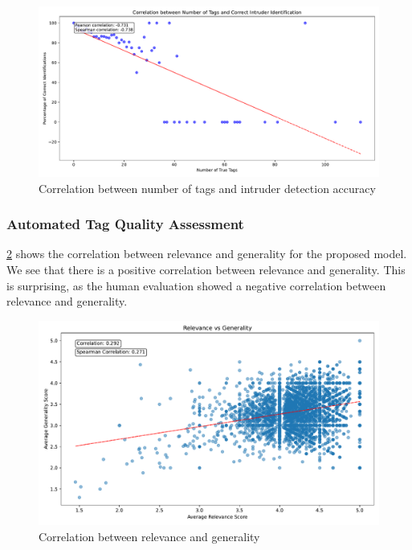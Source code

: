 \begin{figure}[h]
    \centering
    \includegraphics[width=\textwidth]{figures/gpt_correlation_num_tags.pdf}
    \caption{Correlation between number of tags and intruder detection accuracy}
    \label{fig:gpt_correlation_num_tags}
\end{figure}

\subsubsection{Automated Tag Quality Assessment}
\cref{fig:gpt_relevance_vs_generality} shows the correlation between relevance and generality for the proposed model. We see that there is a positive correlation between relevance and generality. This is surprising, as the human evaluation showed a negative correlation between relevance and generality.

\begin{figure}[h]
    \centering
    \includegraphics[width=\textwidth]{figures/gpt_relevance_vs_generality.pdf}
    \caption{Correlation between relevance and generality}
    \label{fig:gpt_relevance_vs_generality}
\end{figure}

